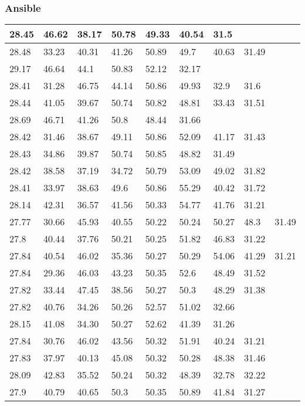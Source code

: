 \subsubsection{Ansible}
\begin{tabular}{ | l | l | l | l | l | l | l | l | l | }
\hline
	28.45 & 46.62 & 38.17 & 50.78 & 49.33 & 40.54 & 31.5 &  &  \\ \hline
	28.48 & 33.23 & 40.31 & 41.26 & 50.89 & 49.7 & 40.63 & 31.49 &  \\ \hline
	29.17 & 46.64 & 44.1 & 50.83 & 52.12 & 32.17 &  &  &  \\ \hline
	28.41 & 31.28 & 46.75 & 44.14 & 50.86 & 49.93 & 32.9 & 31.6 &  \\ \hline
	28.44 & 41.05 & 39.67 & 50.74 & 50.82 & 48.81 & 33.43 & 31.51 &  \\ \hline
	28.69 & 46.71 & 41.26 & 50.8 & 48.44 & 31.66 &  &  &  \\ \hline
	28.42 & 31.46 & 38.67 & 49.11 & 50.86 & 52.09 & 41.17 & 31.43 &  \\ \hline
	28.43 & 34.86 & 39.87 & 50.74 & 50.85 & 48.82 & 31.49 &  &  \\ \hline
	28.42 & 38.58 & 37.19 & 34.72 & 50.79 & 53.09 & 49.02 & 31.82 &  \\ \hline
	28.41 & 33.97 & 38.63 & 49.6 & 50.86 & 55.29 & 40.42 & 31.72 &  \\ \hline
	28.14 & 42.31 & 36.57 & 41.56 & 50.33 & 54.77 & 41.76 & 31.21 &  \\ \hline
	27.77 & 30.66 & 45.93 & 40.55 & 50.22 & 50.24 & 50.27 & 48.3 & 31.49 \\ \hline
	27.8 & 40.44 & 37.76 & 50.21 & 50.25 & 51.82 & 46.83 & 31.22 &  \\ \hline
	27.84 & 40.54 & 46.02 & 35.36 & 50.27 & 50.29 & 54.06 & 41.29 & 31.21 \\ \hline
	27.84 & 29.36 & 46.03 & 43.23 & 50.35 & 52.6 & 48.49 & 31.52 &  \\ \hline
	27.82 & 33.44 & 47.45 & 38.56 & 50.27 & 50.3 & 48.29 & 31.38 &  \\ \hline
	27.82 & 40.76 & 34.26 & 50.26 & 52.57 & 51.02 & 32.66 &  &  \\ \hline
	28.15 & 41.08 & 34.30 & 50.27 & 52.62 & 41.39 & 31.26 &  &  \\ \hline
	27.84 & 30.76 & 46.02 & 43.56 & 50.32 & 51.91 & 40.24 & 31.21 &  \\ \hline
	27.83 & 37.97 & 40.13 & 45.08 & 50.32 & 50.28 & 48.38 & 31.46 &  \\ \hline
	28.09 & 42.83 & 35.52 & 50.24 & 50.32 & 48.39 & 32.78 & 32.22 &  \\ \hline
	27.9 & 40.79 & 40.65 & 50.3 & 50.35 & 50.89 & 41.84 & 31.27 &  \\ \hline
\end{tabular}



